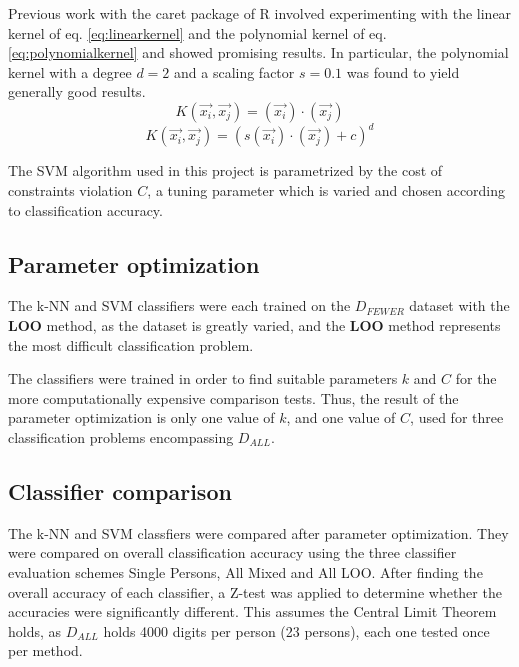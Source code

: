 Previous work with the caret package of R
involved experimenting with the linear kernel of eq. \eqref{eq:linearkernel}
and the polynomial kernel of eq. \eqref{eq:polynomialkernel}
and showed promising results.
In particular, the polynomial kernel with a degree \(d=2\)
and a scaling factor \(s=0.1\) was found to yield generally good results.
\begin{equation}
K(\overrightarrow{x_i},\overrightarrow{x_j}) = (\overrightarrow{x_i}) \cdot 
(\overrightarrow{x_j})
\label{eq:linearkernel} 
\end{equation}
\begin{equation}
K(\overrightarrow{x_i},\overrightarrow{x_j}) = (s(\overrightarrow{x_i}) \cdot 
(\overrightarrow{x_j})+c)^d
\label{eq:polynomialkernel}
\end{equation}

The SVM algorithm used in this project is parametrized
by the cost of constraints violation \(C\),
a tuning parameter which is varied and chosen
according to classification accuracy.

\subsection{Parameter optimization}
The k-NN and SVM classifiers were each trained on the \(D_{FEWER}\)
dataset with the \textbf{LOO} method, as the dataset
is greatly varied, and the \textbf{LOO} method
represents the most difficult classification problem.

The classifiers were trained in order to find
suitable parameters \(k\) and \(C\) for the more computationally
expensive comparison tests.
Thus, the result of the parameter optimization is
only one value of \(k\), and one value of \(C\),
used for three classification problems encompassing \(D_{ALL}\).

\subsection{Classifier comparison}
The k-NN and SVM
classfiers were compared
after parameter optimization.
They were compared on overall classification accuracy
using the three classifier evaluation schemes
Single Persons, All Mixed and All LOO.
After finding the overall accuracy of each classifier,
a Z-test was applied to determine whether
the accuracies were significantly different.
This assumes the Central Limit Theorem holds,
as \(D_{ALL}\) holds 4000 digits per person (23 persons),
each one tested once per method.

